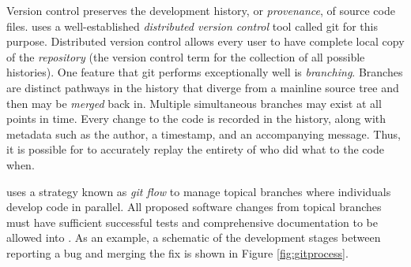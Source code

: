Version control preserves the development history, or \emph{provenance}, of
source code files. \Cyclus uses a well-established \emph{distributed version
control} tool called git \cite{software_freedom_conservancy_git_2014} for this
purpose.  Distributed version control allows every
user to have complete local copy of the \emph{repository} (the version control
term for the collection of all possible histories).
One feature that git performs exceptionally well is \emph{branching}.
Branches are distinct pathways in the history that diverge from a mainline source
tree and then may be \emph{merged} back in. Multiple simultaneous
branches may exist at all points in time. Every change to the code is recorded
in the history, along with metadata such as the author, a timestamp, and an
accompanying message. Thus,
it is possible for \Cyclus to accurately replay the entirety of who did what to the
code when.

\Cyclus uses a strategy known as \emph{git flow}
\cite{kalliamvakou_code-centric_2014} to manage topical branches where
individuals develop code in parallel. All proposed software changes from
topical branches must have sufficient successful tests and comprehensive
documentation to be allowed into \Cyclus.  As an example, a schematic of the
development stages between reporting a bug and merging the fix is shown in
Figure \ref{fig:gitprocess}.

